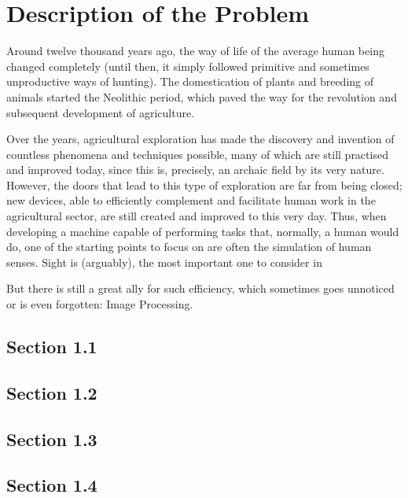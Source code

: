 




\chapter{Description of the Problem}\label{cha:introduction_description}

Around twelve thousand years ago, the way of life of the average human being changed completely (until then, it simply followed primitive and sometimes unproductive ways of hunting). The domestication of plants and breeding of animals started the Neolithic period, which paved the way for the revolution and subsequent development of agriculture. %

Over the years, agricultural exploration has made the discovery and invention of countless phenomena and techniques possible, many of which are still practised and improved today, since this is, precisely, an archaic field by its very nature.
However, the doors that lead to this type of exploration are far from being closed; new devices, able to efficiently complement and facilitate human work in the agricultural sector, are still created and improved to this very day. Thus, when developing a machine capable of performing tasks that, normally, a human would do, one of the starting points to focus on are often the simulation of human senses. Sight is (arguably), the most important one to consider in 

But there is still a great ally for such efficiency, which sometimes goes unnoticed or is even forgotten: Image Processing.

\section{Section 1.1}\label{sub:sub1_1}

\section{Section 1.2}\label{sec:sub1_2}

\section{Section 1.3}\label{sec:sub1_3}

\section{Section 1.4}\label{sec:sub1_4}